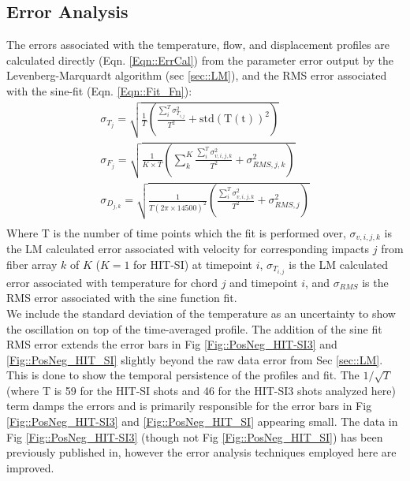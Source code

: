 \subsection{Error Analysis}\label{sec:ErrorAnal}
\hspace*{4ex}The errors associated with the temperature, flow, and displacement profiles are calculated directly (Eqn. \ref{Eqn::ErrCal}) from the parameter error output by the Levenberg-Marquardt algorithm (sec \ref{sec::LM}), and the RMS error associated with the sine-fit (Eqn. \ref{Eqn::Fit_Fn}):
\begin{equation}\label{Eqn::ErrCal}
\begin{split}
\sigma_{T_j} = \sqrt{\frac{1}{T}\left(\frac{\sum_i^T\sigma_{T_{i,j}}^2}{T^2} + \mathrm{std(T(t))^2}\right)}\\
\sigma_{F_j}=\sqrt{\frac{1}{K\times{T}}\left(\sum_k^K\frac{\sum_i^T\sigma_{v,i,j,k}^2 }{T^2}+\sigma_{RMS,j,k}^2\right)}\\
\sigma_{D_{j,k}}=\sqrt{\frac{1}{T{\left(2\pi\times14500\right)^2}}\left(\frac{\sum_i^T\sigma_{v,i,j,k}^2}{T^2}+\sigma_{RMS,j}^2\right)}\\
\end{split}
\end{equation}
Where T is the number of time points which the fit is performed over, $\sigma_{v,i,j,k}$ is the LM calculated error associated with velocity for corresponding impacts $j$ from fiber array $k$ of $K$ ($K=1$ for HIT-SI) at timepoint $i$, $\sigma_{T_{i,j}}$ is the LM calculated error associated with temperature for chord $j$ and timepoint $i$, and $\sigma_{RMS}$ is the RMS error associated with the sine function fit.\\
\hspace*{4ex}We include the standard deviation of the temperature as an uncertainty to show the oscillation on top of the time-averaged profile. The addition of the sine fit RMS error extends the error bars in Fig \ref{Fig::PosNeg_HIT-SI3} and \ref{Fig::PosNeg_HIT_SI} slightly beyond the raw data error from Sec \ref{sec::LM}. This is done to show the temporal persistence of the profiles and fit. The $1/\sqrt{T}$ (where T is 59 for the HIT-SI shots and 46 for the HIT-SI3 shots analyzed here) term damps the errors and is primarily responsible for the error bars in Fig \ref{Fig::PosNeg_HIT-SI3} and \ref{Fig::PosNeg_HIT_SI} appearing small. The data in Fig \ref{Fig::PosNeg_HIT-SI3} (though not Fig \ref{Fig::PosNeg_HIT_SI}) has been previously published in\cite{Hossack_HitSi3}, however the error analysis techniques employed here are improved.  \\
